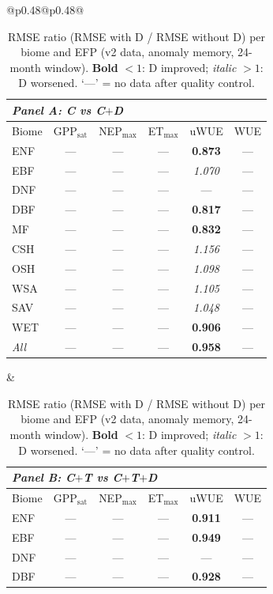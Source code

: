 \begin{table}[htbp]
\centering
\caption{RMSE ratio (RMSE with D / RMSE without D) per biome and EFP
(v2 data, anomaly memory, 24-month window). \textbf{Bold} $<1$: D improved;
\textit{italic} $>1$: D worsened. `---' = no data after quality control.}
\label{tab:rmse_ratio_v2}
\begin{tabular}{@{}p{0.48\linewidth}@{\hspace{0.04\linewidth}}p{0.48\linewidth}@{}}
\footnotesize
\setlength{\tabcolsep}{3.5pt}
\renewcommand{\arraystretch}{1.06}
\begin{tabular}{lccccc}
\toprule
\multicolumn{6}{l}{\textit{Panel A: C vs C$+$D}} \\
\midrule
Biome & GPP$_\mathrm{sat}$ & NEP$_\mathrm{max}$ & ET$_\mathrm{max}$ & uWUE & WUE \\
\midrule
ENF & --- & --- & --- & \textbf{0.873} & --- \\
EBF & --- & --- & --- & \textit{1.070} & --- \\
DNF & --- & --- & --- & --- & --- \\
DBF & --- & --- & --- & \textbf{0.817} & --- \\
MF & --- & --- & --- & \textbf{0.832} & --- \\
CSH & --- & --- & --- & \textit{1.156} & --- \\
OSH & --- & --- & --- & \textit{1.098} & --- \\
WSA & --- & --- & --- & \textit{1.105} & --- \\
SAV & --- & --- & --- & \textit{1.048} & --- \\
WET & --- & --- & --- & \textbf{0.906} & --- \\
\midrule
\textit{All} & --- & --- & --- & \textbf{0.958} & --- \\
\bottomrule
\end{tabular} &
\footnotesize
\setlength{\tabcolsep}{3.5pt}
\renewcommand{\arraystretch}{1.06}
\begin{tabular}{lccccc}
\toprule
\multicolumn{6}{l}{\textit{Panel B: C$+$T vs C$+$T$+$D}} \\
\midrule
Biome & GPP$_\mathrm{sat}$ & NEP$_\mathrm{max}$ & ET$_\mathrm{max}$ & uWUE & WUE \\
\midrule
ENF & --- & --- & --- & \textbf{0.911} & --- \\
EBF & --- & --- & --- & \textbf{0.949} & --- \\
DNF & --- & --- & --- & --- & --- \\
DBF & --- & --- & --- & \textbf{0.928} & --- \\

\end{tabular}
\end{tabular}
\end{table}
